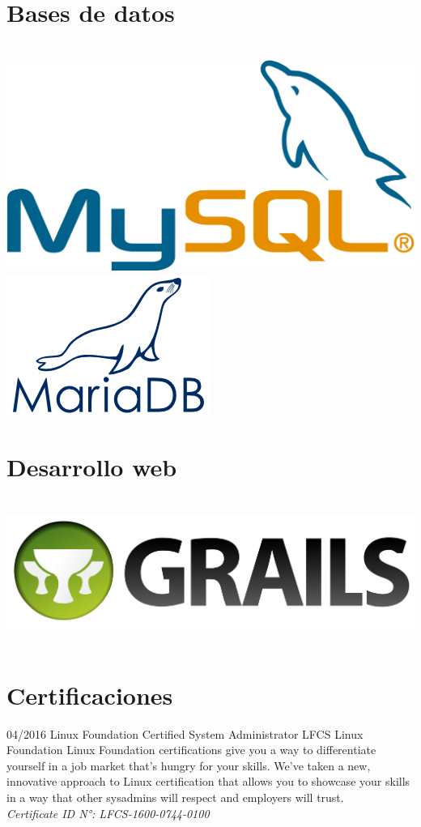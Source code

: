 \documentclass[]{friggeri-cv}
\begin{document}
\begin{aside}
    \section{Bases de datos}
    ~
    \includegraphics[scale=0.04]{img/mysql.png}
    \includegraphics[scale=0.30]{img/mariadb.png}
    ~
    \section{Desarrollo web}
    ~
    \includegraphics[scale=0.02]{img/grails.png}
    ~
\end{aside}
\section{Certificaciones}
\begin{entrylist}
    \entry
    {04/2016}
    {Linux Foundation Certified System Administrator LFCS}
    {Linux Foundation}
    {Linux Foundation certifications give you a way to differentiate yourself in
    a job market that's hungry for your skills. We've taken a new, innovative
    approach to Linux certification that allows you to showcase your skills in a
     way that other sysadmins will respect and employers will trust.\\
     \emph{Certificate ID N°{:} LFCS-1600-0744-0100}}
\end{entrylist}
\end{document}
